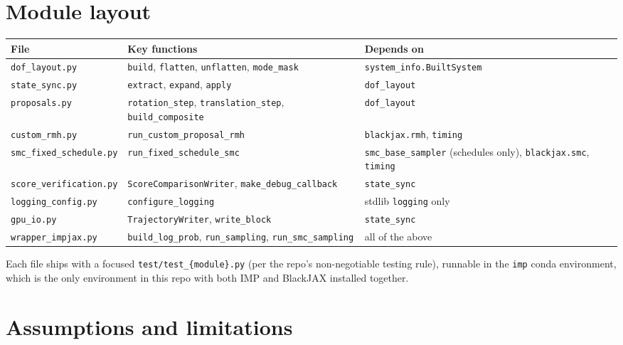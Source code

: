\documentclass[11pt]{article}
\begin{document}
\section{Module layout}
\label{sec:modules}

\begin{center}
\small
\begin{tabular}{@{}l p{5.3cm} p{3.2cm}@{}}
\toprule
File & Key functions & Depends on \\
\midrule
\texttt{dof\_layout.py} & \texttt{build}, \texttt{flatten}, \texttt{unflatten}, \texttt{mode\_mask} & \texttt{system\_info.BuiltSystem} \\
\texttt{state\_sync.py} & \texttt{extract}, \texttt{expand}, \texttt{apply} & \texttt{dof\_layout} \\
\texttt{proposals.py} & \texttt{rotation\_step}, \texttt{translation\_step}, \texttt{build\_composite} & \texttt{dof\_layout} \\
\texttt{custom\_rmh.py} & \texttt{run\_custom\_proposal\_rmh} & \texttt{blackjax.rmh}, \texttt{timing} \\
\texttt{smc\_fixed\_schedule.py} & \texttt{run\_fixed\_schedule\_smc} & \texttt{smc\_base\_sampler} (schedules only), \texttt{blackjax.smc}, \texttt{timing} \\
\texttt{score\_verification.py} & \texttt{ScoreComparisonWriter}, \texttt{make\_debug\_callback} & \texttt{state\_sync} \\
\texttt{logging\_config.py} & \texttt{configure\_logging} & stdlib \texttt{logging} only \\
\texttt{gpu\_io.py} & \texttt{TrajectoryWriter}, \texttt{write\_block} & \texttt{state\_sync} \\
\texttt{wrapper\_impjax.py} & \texttt{build\_log\_prob}, \texttt{run\_sampling}, \texttt{run\_smc\_sampling} & all of the above \\
\bottomrule
\end{tabular}
\end{center}

Each file ships with a focused \texttt{test/test\_\{module\}.py} (per the
repo's non-negotiable testing rule), runnable in the \texttt{imp} conda
environment, which is the only environment in this repo with both IMP and
BlackJAX installed together.

\section{Assumptions and limitations}
\label{sec:limitations}
\end{document}

